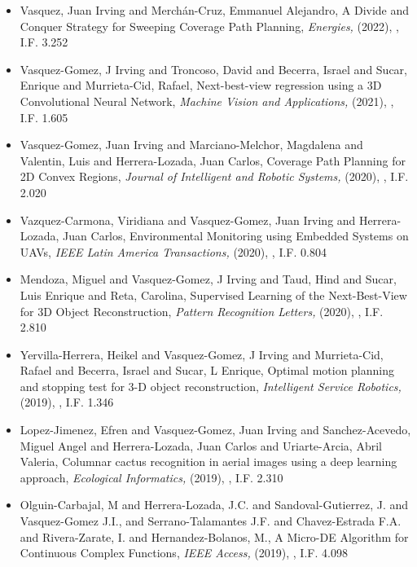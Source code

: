 \begin{itemize}
\item Vasquez, Juan Irving and Merchán-Cruz, Emmanuel Alejandro, A Divide and Conquer Strategy for Sweeping Coverage Path Planning,\textit{ Energies,} (2022), \href{https://doi.org/10.3390/en15217898} {\faFilePdfO}, I.F. 3.252 
\item Vasquez-Gomez, J Irving and Troncoso, David and Becerra, Israel and Sucar, Enrique and Murrieta-Cid, Rafael, Next-best-view regression using a 3D Convolutional Neural Network,\textit{ Machine Vision and Applications,} (2021), \href{10.1007/s00138-020-01166-2} {\faFilePdfO}, I.F. 1.605 
\item Vasquez-Gomez, Juan Irving and Marciano-Melchor, Magdalena and Valentin, Luis and Herrera-Lozada, Juan Carlos, Coverage Path Planning for 2D Convex Regions,\textit{ Journal of Intelligent and Robotic Systems,} (2020), \href{10.1007/s10846-019-01024-y} {\faFilePdfO}, I.F. 2.020 
\item Vazquez-Carmona, Viridiana and Vasquez-Gomez, Juan Irving and Herrera-Lozada, Juan Carlos, Environmental Monitoring using Embedded Systems on UAVs,\textit{ IEEE Latin America Transactions,} (2020), \href{https://doi.org/10.1109/TLA.2020.9085284} {\faFilePdfO}, I.F. 0.804 
\item Mendoza, Miguel and Vasquez-Gomez, J Irving and Taud, Hind and Sucar, Luis Enrique and Reta, Carolina, Supervised Learning of the Next-Best-View for 3D Object Reconstruction,\textit{ Pattern Recognition Letters,} (2020), \href{10.1016/j.patrec.2020.02.024} {\faFilePdfO}, I.F. 2.810 
\item Yervilla-Herrera, Heikel and Vasquez-Gomez, J Irving and Murrieta-Cid, Rafael and Becerra, Israel and Sucar, L Enrique, Optimal motion planning and stopping test for 3-D object reconstruction,\textit{ Intelligent Service Robotics,} (2019), \href{https://doi.org/10.1007/s11370-018-0264-y} {\faFilePdfO}, I.F. 1.346 
\item Lopez-Jimenez, Efren and Vasquez-Gomez, Juan Irving and Sanchez-Acevedo, Miguel Angel and Herrera-Lozada, Juan Carlos and Uriarte-Arcia, Abril Valeria, Columnar cactus recognition in aerial images using a deep learning approach,\textit{ Ecological Informatics,} (2019), \href{https://doi.org/10.1016/j.ecoinf.2019.05.005} {\faFilePdfO}, I.F. 2.310 
\item Olguin-Carbajal, M and Herrera-Lozada, J.C. and Sandoval-Gutierrez, J. and Vasquez-Gomez J.I., and Serrano-Talamantes J.F. and Chavez-Estrada F.A. and Rivera-Zarate, I. and Hernandez-Bolanos, M., A Micro-DE Algorithm for Continuous Complex Functions,\textit{ IEEE Access,} (2019), \href{10.1109/ACCESS.2019.2954296} {\faFilePdfO}, I.F. 4.098 

\end{itemize}

